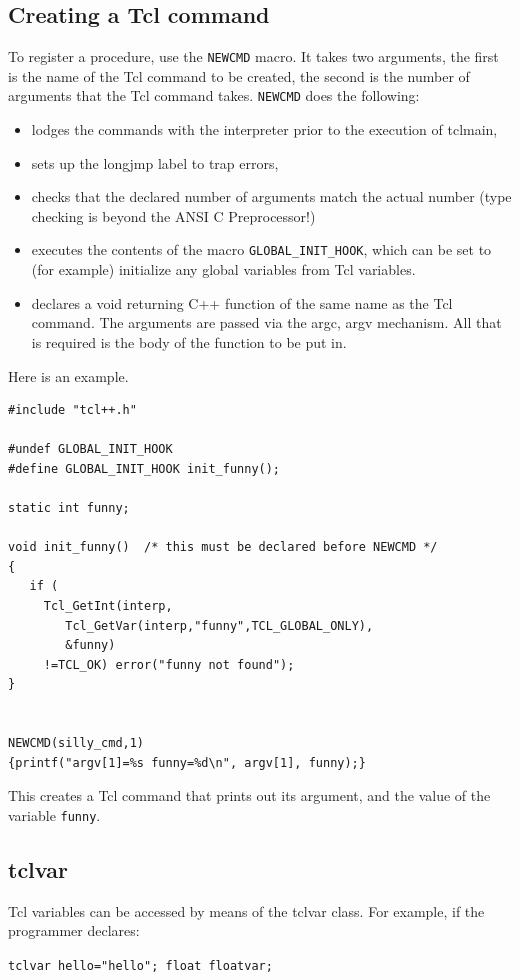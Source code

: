 \subsection{Creating a Tcl command}
To register a procedure, use the \verb|NEWCMD| macro. It takes two
arguments, the first is the name of the Tcl command to be created, the
second is the number of arguments that the Tcl command takes.
\verb|NEWCMD| does the following:
\begin{itemize}
\item lodges  the commands with the interpreter prior to the
execution of tclmain,
\item sets up the longjmp label to trap errors,
\item checks that the declared number of arguments match the actual
number (type checking is beyond the ANSI C Preprocessor!)
\item executes the contents of the macro \verb|GLOBAL_INIT_HOOK|,
which can be set to (for example) initialize any global variables from
Tcl variables.
\item declares a void returning C++ function of the same name as the
Tcl command. The arguments are passed via the argc, argv
mechanism. All that is required is the body of the function to be put
in.
\end{itemize}

Here is an example.
\begin{verbatim}
#include "tcl++.h"

#undef GLOBAL_INIT_HOOK
#define GLOBAL_INIT_HOOK init_funny();

static int funny;

void init_funny()  /* this must be declared before NEWCMD */
{
   if ( 
     Tcl_GetInt(interp, 
        Tcl_GetVar(interp,"funny",TCL_GLOBAL_ONLY), 
        &funny) 
     !=TCL_OK) error("funny not found"); 
}


NEWCMD(silly_cmd,1)
{printf("argv[1]=%s funny=%d\n", argv[1], funny);}
\end{verbatim}
This creates a Tcl command that prints out its argument, and the value
of the variable \verb|funny|.

\subsection{tclvar}

Tcl variables can be accessed by means of the tclvar class. For
example, if the programmer declares:

\verb|tclvar hello="hello"; float floatvar;|

